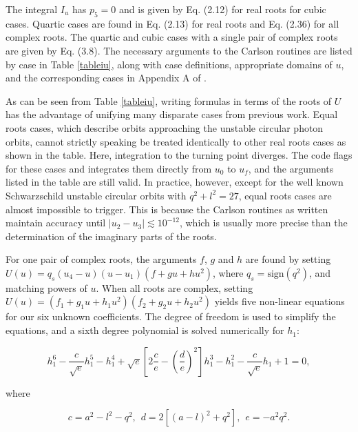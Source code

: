 \documentclass[apj]{emulateapj}
\begin{document}
The integral $I_u$ has $p_5 = 0$ and is given by \citet{carlson89} Eq. (2.12) for real roots for cubic cases. Quartic cases are found in \citet{carlsonQUART} Eq. (2.13) for real roots and \citet{carlsonDOUBLE} Eq. (2.36) for all complex roots. The quartic and cubic cases with a single pair of complex roots are given by \citet{carlson89} Eq. (3.8). The necessary arguments to the Carlson routines are listed by case in Table \ref{tableiu}, along with case definitions, appropriate domains of $u$, and the corresponding cases in Appendix A of .

As can be seen from Table \ref{tableiu}, writing formulas in terms of the roots of $U$ has the advantage of unifying many disparate cases from previous work. Equal roots cases, which describe orbits approaching the unstable circular photon orbits, cannot strictly speaking be treated identically to other real roots cases as shown in the table. Here, integration to the turning point diverges. The code flags for these cases and integrates them directly from $u_0$ to $u_f$, and the arguments listed in the table are still valid. In practice, however, except for the well known Schwarzschild unstable circular orbits with $q^2 + l^2 = 27$, equal roots cases are almost impossible to trigger. This is because the Carlson routines as written maintain accuracy until $\vert u_2 - u_3 \vert \lesssim 10^{-12}$, which is usually more precise than the determination of the imaginary parts of the roots.

For one pair of complex roots, the arguments $f$, $g$ and $h$ are found by setting $U(u)=q_s(u_4-u)(u-u_1)(f+g u+h u^2)$, where $q_s = \mathrm{sign}(q^2)$, and matching powers of $u$. When all roots are complex, setting $U(u)=(f_1+g_1 u+h_1 u^2)(f_2+g_2 u+h_2 u^2)$ yields five non-linear equations for our six unknown coefficients. The degree of freedom is used to simplify the equations, and a sixth degree polynomial is solved numerically for $h_1$:
 
\begin{equation}\label{h1}
 h_1^6 - \frac{c}{\sqrt{e}} h_1^5 - h_1^4 + \sqrt{e}\left[2 \frac{c}{e}-\left (\frac{d}{e}\right)^2\right]h_1^3-h_1^2-\frac{c}{\sqrt{e}} h_1 + 1 = 0,
\end{equation}
 
\noindent where

\begin{equation}\label{de}
 c = a^2-l^2-q^2,\hspace{5pt} d=2[(a-l)^2+q^2],\hspace{5pt} e=-a^2 q^2.
\end{equation}
\end{document}
